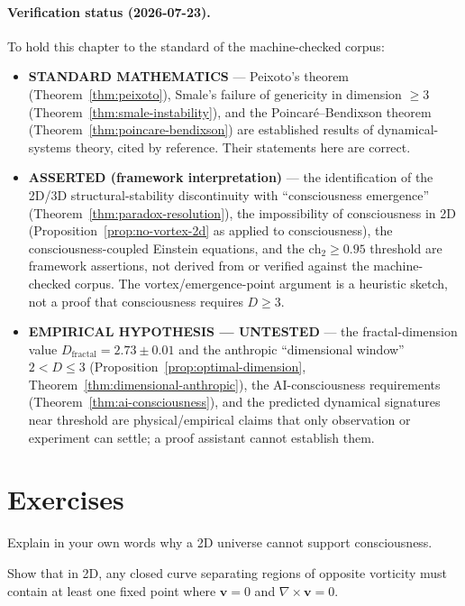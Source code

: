 \paragraph{Verification status (2026-07-23).}\label{sec:ch05-verification-status}
To hold this chapter to the standard of the machine-checked corpus:
\begin{itemize}
\item \textbf{STANDARD MATHEMATICS} --- Peixoto's theorem (Theorem~\ref{thm:peixoto}), Smale's failure of genericity in dimension $\ge 3$ (Theorem~\ref{thm:smale-instability}), and the Poincar\'e--Bendixson theorem (Theorem~\ref{thm:poincare-bendixson}) are established results of dynamical-systems theory, cited by reference. Their statements here are correct.
\item \textbf{ASSERTED (framework interpretation)} --- the identification of the 2D/3D structural-stability discontinuity with ``consciousness emergence'' (Theorem~\ref{thm:paradox-resolution}), the impossibility of consciousness in 2D (Proposition~\ref{prop:no-vortex-2d} as applied to consciousness), the consciousness-coupled Einstein equations, and the $\mathrm{ch}_2\ge 0.95$ threshold are framework assertions, not derived from or verified against the machine-checked corpus. The vortex/emergence-point argument is a heuristic sketch, not a proof that consciousness requires $D\ge 3$.
\item \textbf{EMPIRICAL HYPOTHESIS --- UNTESTED} --- the fractal-dimension value $D_{\text{fractal}}=2.73\pm0.01$ and the anthropic ``dimensional window'' $2<D\le 3$ (Proposition~\ref{prop:optimal-dimension}, Theorem~\ref{thm:dimensional-anthropic}), the AI-consciousness requirements (Theorem~\ref{thm:ai-consciousness}), and the predicted dynamical signatures near threshold are physical/empirical claims that only observation or experiment can settle; a proof assistant cannot establish them.
\end{itemize}

\section{Exercises}

\begin{exercise}[Easy]
Explain in your own words why a 2D universe cannot support consciousness.
\end{exercise}

\begin{exercise}[Medium]
Show that in 2D, any closed curve separating regions of opposite vorticity must contain at least one fixed point where $\mathbf{v} = 0$ and $\nabla \times \mathbf{v} = 0$.
\end{exercise}

